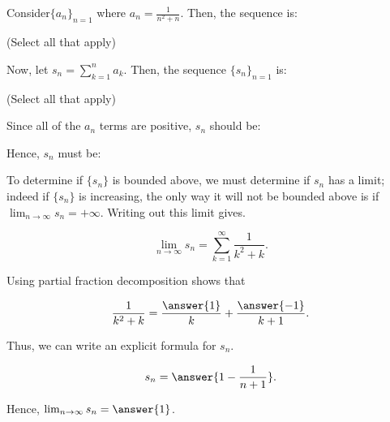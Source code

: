 \documentclass{ximera}
\author{Jim Talamo}
\begin{document}
\begin{exercise}
Consider$\{a_n \}_{n=1}$ where $a_n = \frac{1}{n^2+n}$.  Then, the sequence is:

\begin{selectAll}
\end{selectAll}
(Select all that apply)

Now, let $s_n = \sum_{k=1}^{n} a_k$.  Then, the sequence $\{s_n \}_{n=1}$ is:
\begin{selectAll}
\end{selectAll}
(Select all that apply)

\begin{hint}
Since all of the $a_n$ terms are positive, $s_n$ should be:

\begin{multipleChoice}
\end{multipleChoice}

Hence, $s_n$ must be:
\begin{multipleChoice}
\end{multipleChoice}

To determine if $\{s_n\}$ is bounded above, we must determine if $s_n$ has a limit; indeed if $\{s_n\}$ is increasing, the only way it will not be bounded above is if $\lim_{n \to \infty} s_n = +\infty$.  Writing out this limit gives.

\[
\lim_{n \to \infty} s_n = \sum_{k=1}^{\infty}  \frac{1}{k^2+k}.
\]

Using partial fraction decomposition shows that

\[
\frac{1}{k^2+k} = \frac{\answer{1}}{k}+\frac{\answer{-1}}{k+1}.
\]

Thus, we can write an explicit formula for $s_n$.

\[
s_n=\answer{1 -\frac{1}{n+1}}.
\]

Hence, $\lim_{n \to \infty} s_n = \answer{1}$.
\end{hint}
\end{exercise}
\end{document}
